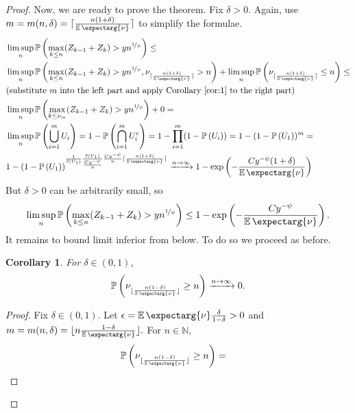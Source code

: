 \documentclass[12pt]{article}
\DeclarePairedDelimiter\floor{\lfloor}{\rfloor}
\DeclarePairedDelimiter\ceil{\lceil}{\rceil}
\newcommand{\opsi}{\nicefrac{1}{\psi}}
\newcommand{\Pro}{\mathbb{P}}
\newcommand{\converges}{\xrightarrow{n \rightarrow \infty}}
\newcommand*\Proo[1]{\Pro \left( #1 \right) }
\newtheorem{corollary}{Corollary}[theorem]
\newcommand{\expect}{\operatorname{\mathbb{E}}\expectarg}
\begin{document}
\begin{proof}
Now, we are ready to prove the theorem. Fix $\delta > 0.$ Again, use $m = m(n, \delta) = \ceil{ \frac{n(1+\delta)}{\expect{\nu}}}$ to simplify the formulae.
\begin{equation*}
\begin{aligned}
    &\limsup_n \Proo{\max_{k\leq n} (Z_{k-1} + Z_k) > yn^{\opsi}} \leq \\
    &\limsup_n \Proo{\max_{k\leq n} (Z_{k-1} + Z_k) > yn^{\opsi}, \nu_{ \ceil{ \frac{n(1+\delta)}{\expect{\nu}}} } > n} + \limsup_n \Proo{\nu_{\ceil {\frac{n(1+\delta)}{\expect{\nu}}} } \leq n} \leq \\
    &\text{(substitute } m \text{ into the left part and apply Corollary \ref{cor:1} to the right part)} \\ 
    &\limsup_n \Proo{\max_{k\leq \nu_m} (Z_{k-1} + Z_k) > yn^{\opsi}} + 0 = \\
    &\limsup_n \Proo{\bigcup_{i=1}^{m}U_i} = 1 - \Proo{\bigcap_{i=1}^m U_i^c} = 1 - \prod_{i=1}^{m}(1 - \Proo{U_i}) = 1 - (1 - \Proo{U_1})^m = \\
    &1 - (1- \Proo{U_1})^{\frac{1}{\Proo{U_1}} \frac{\Proo{U_1}}{\frac{Cy^{-\psi}}{n}}\frac{Cy^{-\psi}}{n} \ceil{ \frac{n(1+\delta)}{\expect{\nu}}} } \converges 1-\exp\left(-\frac{Cy^{-\psi}(1+\delta)}{\expect{\nu}} \right)
\end{aligned}
\end{equation*}
But $\delta >0$ can be arbitrarily small, so
\begin{equation}\label{eq:limsup_bound}
    \limsup_n \Proo{\max_{k\leq n} (Z_{k-1} + Z_k) > yn^{\opsi}} \leq 1-\exp\left(-\frac{Cy^{-\psi}}{\expect{\nu}} \right).
\end{equation}
It remains to bound limit inferior from below. To do so we proceed as before. 
\begin{corollary}\label{cor:2}
For $\delta \in (0, 1)$,
\begin{equation*}
\Proo{\nu_{\floor{\frac{n(1-\delta)}{\expect{\nu}}}} \geq n} \converges 0.
\end{equation*}
\end{corollary}
\begin{proof}
Fix $\delta \in (0, 1)$. Let $\epsilon = \expect{\nu}\frac{\delta}{1-\delta} > 0$ and $m = m(n, \delta) = \floor{n \frac{1-\delta}{\expect{\nu}}}.$
For $n \in \mathbb{N},$
\begin{equation*}
\begin{aligned}
    &\Proo{\nu_{\floor{\frac{n(1-\delta)}{\expect{\nu}}}} \geq n} =

\end{aligned}
\end{equation*}
\end{proof}
\end{proof}
\end{document}
